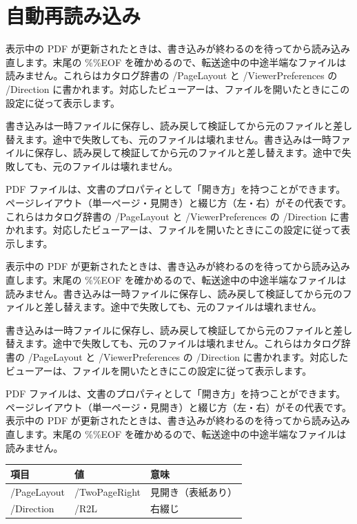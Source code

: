 \documentclass[a5paper,10pt]{ltjsarticle}
\begin{document}
\section{自動再読み込み}
表示中の PDF が更新されたときは、書き込みが終わるのを待ってから読み込み直します。末尾の \%\%EOF を確かめるので、転送途中の中途半端なファイルは読みません。これらはカタログ辞書の /PageLayout と /ViewerPreferences の /Direction に書かれます。対応したビューアーは、ファイルを開いたときにこの設定に従って表示します。

書き込みは一時ファイルに保存し、読み戻して検証してから元のファイルと差し替えます。途中で失敗しても、元のファイルは壊れません。書き込みは一時ファイルに保存し、読み戻して検証してから元のファイルと差し替えます。途中で失敗しても、元のファイルは壊れません。

PDF ファイルは、文書のプロパティとして「開き方」を持つことができます。ページレイアウト（単一ページ・見開き）と綴じ方（左・右）がその代表です。これらはカタログ辞書の /PageLayout と /ViewerPreferences の /Direction に書かれます。対応したビューアーは、ファイルを開いたときにこの設定に従って表示します。

表示中の PDF が更新されたときは、書き込みが終わるのを待ってから読み込み直します。末尾の \%\%EOF を確かめるので、転送途中の中途半端なファイルは読みません。書き込みは一時ファイルに保存し、読み戻して検証してから元のファイルと差し替えます。途中で失敗しても、元のファイルは壊れません。

書き込みは一時ファイルに保存し、読み戻して検証してから元のファイルと差し替えます。途中で失敗しても、元のファイルは壊れません。これらはカタログ辞書の /PageLayout と /ViewerPreferences の /Direction に書かれます。対応したビューアーは、ファイルを開いたときにこの設定に従って表示します。

PDF ファイルは、文書のプロパティとして「開き方」を持つことができます。ページレイアウト（単一ページ・見開き）と綴じ方（左・右）がその代表です。表示中の PDF が更新されたときは、書き込みが終わるのを待ってから読み込み直します。末尾の \%\%EOF を確かめるので、転送途中の中途半端なファイルは読みません。

\begin{center}\begin{tabular}{lll}\hline 項目 & 値 & 意味\\\hline
/PageLayout & /TwoPageRight & 見開き（表紙あり）\\ /Direction & /R2L & 右綴じ\\\hline\end{tabular}\end{center}
\end{document}
